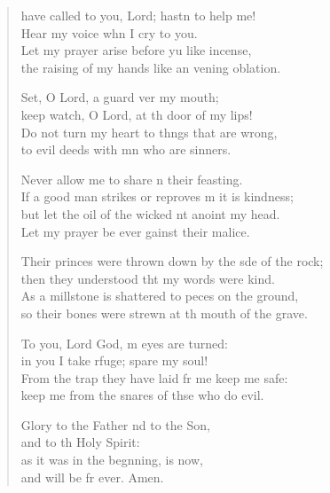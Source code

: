 \settowidth{\versewidth}{Their princes were thrown down by the side of the rock; *}
\begin{verse}%
\begin{patverse}
 have called to you, Lord; hastn to help me!\Med\\
    Hear my voice whn I cry to you.\\
Let my prayer arise before yu like incense,\Med\\
    the raising of my hands like an vening oblation.

Set, O Lord, a guard ver my mouth;\Med\\
    keep watch, O Lord, at th door of my lips!\\
Do not turn my heart to th\pointup{\i}ngs that are wrong,\Med\\
    to evil deeds with mn who are sinners.

Never allow me to share \pointup{\i}n their feasting.\Med\\
    If a good man strikes or reproves m it is kindness;\\
but let the oil of the wicked nt anoint my head.\Med\\
    Let my prayer be ever gainst their malice.

Their princes were thrown down by the s\pointup{\i}de of the rock;\Med\\
    then they understood tht my words were kind.\\
As a millstone is shattered to p\pointup{\i}eces on the ground,\Med\\
    so their bones were strewn at th mouth of the grave.

To you, Lord God, m eyes are turned:\Med\\
    in you I take rfuge; spare my soul!\\
From the trap they have laid fr me keep me safe:\Med\\
    keep me from the snares of thse who do evil.

Glory to the Father nd to the Son,\Med\\
    and to th Holy Spirit:\\
as it was in the beg\pointup{\i}nning, is now,\Med\\
and will be fr ever. Amen.
\end{patverse}
\end{verse}
